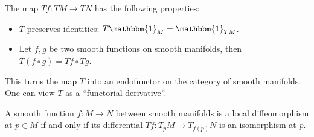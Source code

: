     \begin{property}
        The map $Tf:TM\rightarrow TN$ has the following properties:
        \begin{itemize}
            \item $T$ preserves identities: $T\mathbbm{1}_M = \mathbbm{1}_{TM}$.
            \item Let $f,g$ be two smooth functions on smooth manifolds, then $T(f\circ g) = Tf\circ Tg$.
        \end{itemize}
        This turns the map $T$ into an endofunctor on the category of smooth manifolds. One can view $T$ as a ``functorial derivative''.
    \end{property}


    \begin{theorem}\label{bundle:inverse_function_theorem}
        A smooth function $f:M\rightarrow N$ between smooth manifolds is a local diffeomorphism at $p\in M$ if and only if its differential $Tf:T_pM\rightarrow T_{f(p)}N$ is an isomorphism at $p$.
    \end{theorem}


